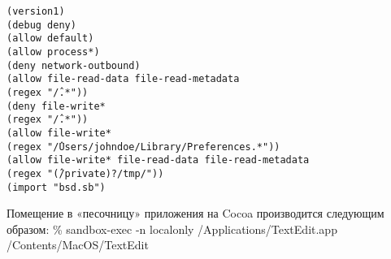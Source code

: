 \begin{flushleft}
\bigskip
\texttt{(version1)\\
(debug deny)\\
(allow default)\\
(allow process*)\\
(deny network-outbound)\\
(allow file-read-data file-read-metadata\\
(regex "\^ /.*"))\\
(deny file-write* \\
(regex "\^ /.*"))\\
(allow file-write*\\
(regex "\^ /Users/johndoe/Library/Preferences.*"))\\
(allow file-write* file-read-data file-read-metadata\\
(regex "\^ (/private)?/tmp/"))\\
(import "bsd.sb")
}
\bigskip
\end{flushleft}

Помещение в «песочницу» приложения на Cocoa производится следующим образом:
\% sandbox-exec -n localonly /Applications/TextEdit.app /Contents/MacOS/TextEdit
